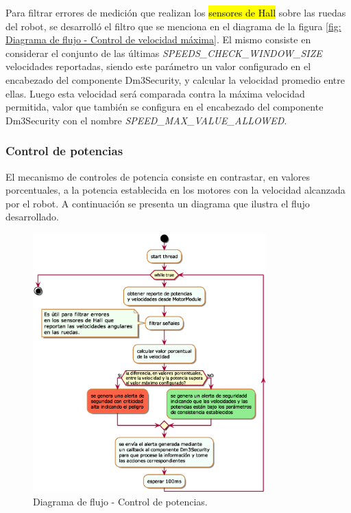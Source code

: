 \documentclass[withindex,glossary]{cam-thesis}
\begin{document}
Para filtrar errores de medición que realizan los \hl{sensores de Hall} sobre las ruedas del robot, se desarrolló el filtro que se menciona en el diagrama de la figura \ref{fig: Diagrama de flujo - Control de velocidad máxima}. El mismo consiste en considerar el conjunto de las últimas \textit{SPEEDS\_CHECK\_WINDOW\_SIZE} velocidades reportadas, siendo este parámetro un valor configurado en el encabezado del componente Dm3Security, y calcular la velocidad promedio entre ellas. Luego esta velocidad será comparada contra la máxima velocidad permitida, valor que también se configura en el encabezado del componente Dm3Security con el nombre \textit{SPEED\_MAX\_VALUE\_ALLOWED}.

\subsubsection{Control de potencias}
El mecanismo de controles de potencia consiste en contrastar, en valores porcentuales, a la potencia establecida en los motores con la velocidad alcanzada por el robot. A continuación se presenta un diagrama que ilustra el flujo desarrollado.

\begin{figure}[H]
\centering
\includegraphics[width=0.8\textwidth]{images/Diagrama_de_flujo_Dm3Security_Pows}
\caption[Diagrama de flujo - Control de potencias]{Diagrama de flujo - Control de potencias.}
\label{fig: Diagrama de flujo - Control de potencias}
\end{figure}
\end{document}
